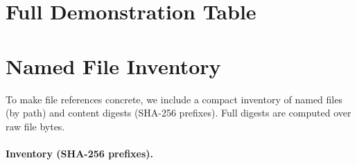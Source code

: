 \documentclass{article} %
\begin{document}



\clearpage
\appendix
\section{Full Demonstration Table}\label{app:fulltable}
\small


\clearpage
\section{Named File Inventory}\label{app:file-inventory}
To make file references concrete, we include a compact inventory of named files (by path) and
content digests (SHA-256 prefixes). Full digests are computed over raw file bytes.

\paragraph{Inventory (SHA-256 prefixes).}
\begin{center}
\scriptsize

\end{center}
\end{document}

